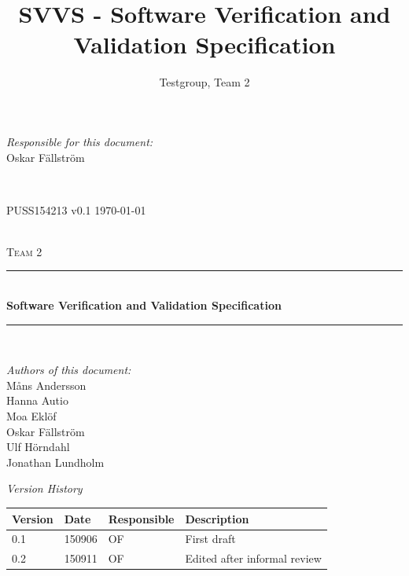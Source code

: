 \documentclass[a4paper]{article}
\title{SVVS - Software Verification and Validation Specification}
\author{Testgroup, Team 2}
\begin{document}
\begin{titlepage}
\newcommand{\HRule}{\rule{\linewidth}{0.5mm}}

\begin{minipage}{0.5\textwidth}
\begin{flushleft} %
\textit{Responsible for this document:}\\
Oskar Fällström %
\end{flushleft}
\end{minipage}
~
\begin{minipage}{0.4\textwidth}
\begin{flushright}
PUSS154213 v0.1 %
\today
\end{flushright}
\end{minipage}\\[3cm]

\centering
\textsc{\LARGE Team 2}\\[0.5cm]

\HRule \\[0.4cm]
{ \huge \bfseries Software Verification and Validation Specification}\\[0.4cm] %
\HRule \\[1.5cm]

\vfill
\begin{flushleft}
\textit{Authors of this document:}\\
Måns Andersson \\
Hanna Autio \\
Moa Eklöf \\
Oskar Fällström \\
Ulf Hörndahl \\
Jonathan Lundholm
\end{flushleft}


\end{titlepage}

\begin{center}
\textit{\large Version History}

    \begin{tabular}{ | l | l | l | p{5cm} |}
    \hline
    \textbf{Version} & \textbf{Date} & \textbf{Responsible} & \textbf{Description} \\ \hline
    0.1 & 150906 & OF & First draft\\ \hline
    0.2 & 150911 & OF &  Edited after informal review\\ \hline
    \end{tabular}
\end{center}
\end{document}
